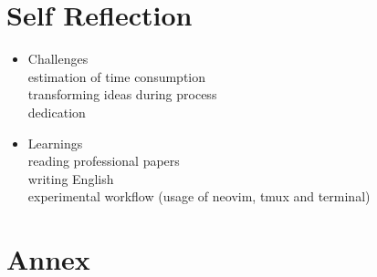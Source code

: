 \documentclass{article}
\begin{document}
\section{Self Reflection}
\begin{itemize}

	\item Challenges\\
		estimation of time consumption\\
		transforming ideas during process\\
		dedication

	\item Learnings\\
		reading professional papers\\
		writing English\\
		experimental workflow (usage of neovim, tmux and terminal)

\end{itemize}

\section{Annex}
\end{document}
